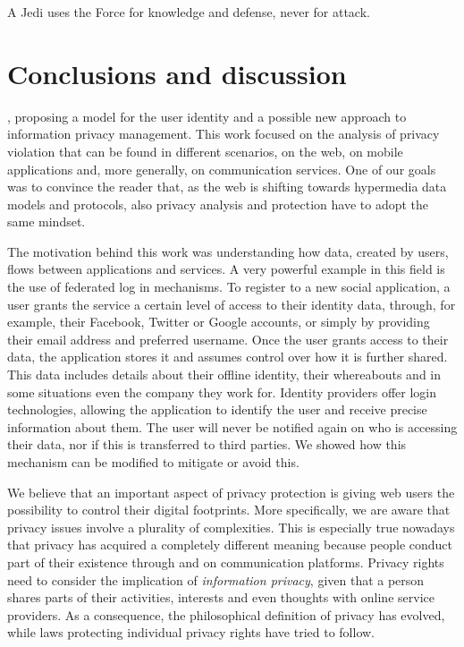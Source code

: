 \begin{savequote}[75mm] 
A Jedi uses the Force for knowledge and defense, never for attack.
\end{savequote}

\chapter{Conclusions and discussion}

, proposing a model for the user identity and a possible new approach to information privacy management. This work focused on the analysis of privacy violation that can be found in different scenarios, on the web, on mobile applications and, more generally, on communication services.
One of our goals was to convince the reader that, as the web is shifting towards hypermedia data models and protocols, also privacy analysis and protection have to adopt the same mindset.

The motivation behind this work was understanding how data, created by users, flows between applications and services. A very powerful example in this field is the use of federated log in mechanisms. To register to a new social application, a user grants the service a certain level of access to their identity data, through, for example, their Facebook, Twitter or Google accounts, or simply by providing their email address and preferred username. Once the user grants access to their data, the application stores it and assumes control over how it is further shared. This data includes details about their offline identity, their whereabouts and in some situations even the company they work for. Identity providers offer login technologies, allowing the application to identify the user and receive precise information about them. The user will never be notified again on who is accessing their data, nor if this is transferred to third parties. We showed how this mechanism can be modified to mitigate or avoid this.

We believe that an important aspect of privacy protection is giving web users the possibility to control their digital footprints. More specifically, we are aware that privacy issues involve a plurality of complexities. This is especially true nowadays that privacy has acquired a completely different meaning because people conduct part of their existence through and on communication platforms. Privacy rights need to consider the implication of \emph{information privacy}, given that a person shares parts of their activities, interests and even thoughts with online service providers. As a consequence, the philosophical definition of privacy has evolved, while laws protecting individual privacy rights have tried to follow.

